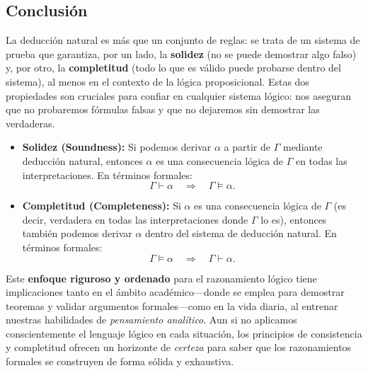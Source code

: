 \subsection*{Conclusión}

La deducción natural es más que un conjunto de reglas: se trata de un sistema de prueba que garantiza, por un lado, la \textbf{solidez} (no se puede demostrar algo falso) y, por otro, la \textbf{completitud} (todo lo que es válido puede probarse dentro del sistema), al menos en el contexto de la lógica proposicional. 
Estas dos propiedades son cruciales para confiar en cualquier sistema lógico: nos aseguran que no probaremos fórmulas falsas y que no dejaremos sin demostrar las verdaderas.


\begin{tcolorbox}[colframe=orange!60, colback=orange!5,  title=\textbf{Preguntas para Reflexionar}]
\begin{itemize}
    \item \textbf{Solidez (Soundness):}  
    Si podemos derivar \(\alpha\) a partir de \(\Gamma\) mediante deducción natural, entonces \(\alpha\) es una consecuencia lógica de \(\Gamma\) en todas las interpretaciones.  
    En términos formales:  
    \[
    \Gamma \vdash \alpha 
    \quad \Longrightarrow \quad
    \Gamma \models \alpha.
    \]
   

    \item \textbf{Completitud (Completeness):}  
    Si \(\alpha\) es una consecuencia lógica de \(\Gamma\) (es decir, verdadera en todas las interpretaciones donde \(\Gamma\) lo es), entonces también podemos derivar \(\alpha\) dentro del sistema de deducción natural.
    En términos formales:  
    \[
    \Gamma \models \alpha 
    \quad \Longrightarrow \quad
    \Gamma \vdash \alpha.
    \]
\end{itemize}
\end{tcolorbox}

Este \textbf{enfoque riguroso y ordenado} para el razonamiento lógico tiene implicaciones tanto en el ámbito académico—donde se emplea para demostrar teoremas y validar argumentos formales—como en la vida diaria, al entrenar nuestras habilidades de \emph{pensamiento analítico}. Aun si no aplicamos conscientemente el lenguaje lógico en cada situación, los principios de consistencia y completitud ofrecen un horizonte de \emph{certeza} para saber que los razonamientos formales se construyen de forma sólida y exhaustiva.

